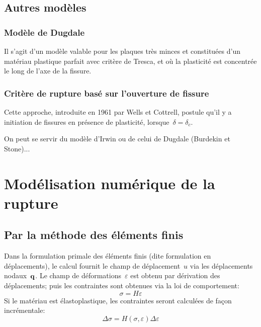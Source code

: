 \medskip
\subsection{Autres modèles}
\medskip
\subsubsection{Modèle de Dugdale}

Il s'agit d'un modèle valable pour les plaques très minces et constituées d'un matériau plastique
parfait avec critère de Tresca, et
où la plasticité est concentrée le long de l'axe de la fissure.

\medskip
\subsubsection{Critère de rupture basé sur l'ouverture de fissure}

Cette approche, introduite en 1961 par Wells et
Cottrell, postule qu'il y a initiation de fissures
en présence de plasticité, lorsque~$\delta=\delta_c$.

On peut se servir du modèle d'Irwin ou de celui de Dugdale (Burdekin et Stone)...


\medskip
\section{Modélisation numérique de la rupture}

\medskip
\subsection{Par la méthode des éléments finis}

Dans la formulation primale des éléments finis (dite formulation en déplacements), le
calcul fournit le champ de déplacement~$u$ via les déplacements nodaux~$\VV{q}$.
Le champ de déformations~$\varepsilon$ est obtenu par dérivation des déplacements;
puis les contraintes sont obtenues via la loi de comportement:
\begin{equation}\sigma=H\varepsilon\end{equation}
Si le matériau est élastoplastique, les contraintes seront calculées de façon
incrémentale:
\begin{equation}\Delta\sigma=H(\sigma,\varepsilon)\Delta\varepsilon\end{equation}

